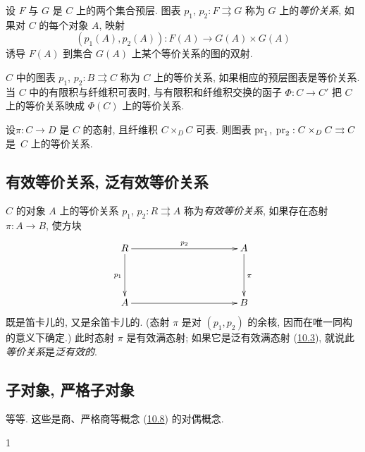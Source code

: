 设 $F$ 与 $G$ 是 $C$ 上的两个集合预层. 图表 $p_1$, $p_2:F\rightrightarrows G$ 称为 $G$ 上的\emph{等价关系}, 如果对 $C$ 的每个对象 $A$, 映射
$$
(p_1(A),p_2(A)):F(A)\longrightarrow G(A)\times G(A)
$$
诱导 $F(A)$ 到集合 $G(A)$ 上某个等价关系的图的双射.

$C$ 中的图表 $p_1$, $p_2:B\rightrightarrows C$ 称为 $C$ 上的等价关系, 如果相应的预层图表是等价关系. 当 $C$ 中的有限积与纤维积可表时, 与有限积和纤维积交换的函子 $\Phi:C\rightarrow C'$ 把 $C$ 上的等价关系映成 $\Phi(C)$ 上的等价关系.

设\pageoriginale $\pi:C\rightarrow D$ 是 $C$ 的态射, 且纤维积 $C\times_D C$ 可表. 则图表 $\operatorname{pr}_1$, $\operatorname{pr}_2:C\times_D C\rightrightarrows C$ 是~$C$ 上的等价关系.

\subsection{有效等价关系, 泛有效等价关系}

$C$ 的对象 $A$ 上的等价关系 $p_1$, $p_2:R\rightrightarrows A$ 称为\emph{有效等价关系}, 如果存在态射 $\pi:A\rightarrow B$, 使方块
\[
\xymatrix@C=3.75cm@R=1.5cm{
R\ar[r]^{p_2} \ar[d]_{p_1}& A \ar[d]^{\pi}\\
A\ar[r] & B }
\]
既是笛卡儿的, 又是余笛卡儿的. (态射 $\pi$ 是对 $(p_1,p_2)$ 的余核, 因而在唯一同构的意义下确定.) 此时态射 $\pi$ 是有效满态射; 如果它是泛有效满态射 (\hyperref[I.sec10.3]{10.3}), 就说此\emph{等价关系}是\emph{泛有效的}.

\subsection{子对象, 严格子对象}

等等. 这些是商、严格商等概念 (\hyperref[I.sec10.8]{10.8}) 的对偶概念.

\begingroup
\makeatletter
\def\Hy@writebookmark#1#2#3#4#5{}
\makeatother
\begin{thebibliography}{1}
 
\end{thebibliography}
\endgroup


\newpage


